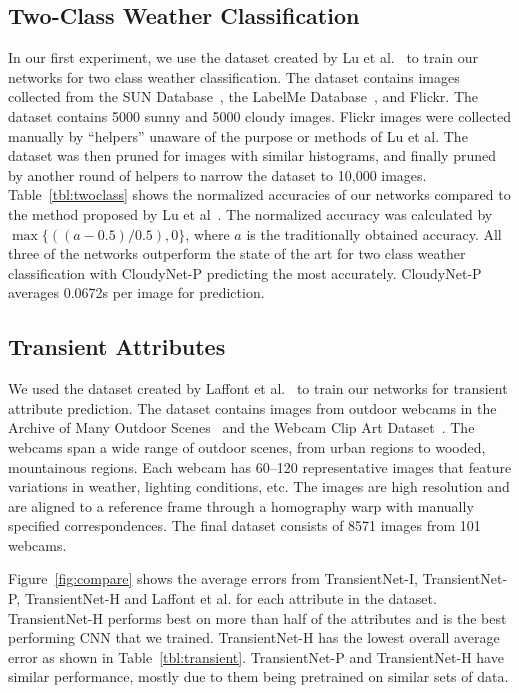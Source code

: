 \documentclass[10pt,twocolumn,letterpaper]{article}
\newcommand{\figref}[1]{Figure~\ref{fig:#1}}
\newcommand{\tblref}[1]{Table~\ref{tbl:#1}}
\begin{document}
\subsection{Two-Class Weather Classification}
\indent
In our first experiment, we use the dataset created by Lu et
al.~\cite{lutwoclass} to train our networks for two class weather
classification.  The dataset contains images collected from the SUN
Database~\cite{xiaoSUN}, the LabelMe Database~\cite{russell2008labelme}, and
Flickr. The dataset contains 5000 sunny and 5000 cloudy images. Flickr images
were collected manually by ``helpers'' unaware of the purpose or methods of Lu
et al. The dataset was then pruned for images with similar histograms, and
finally pruned by another round of helpers to narrow the dataset to 10,000
images.  \tblref{twoclass} shows the normalized accuracies of our networks
compared to the method proposed by Lu et al~\cite{lutwoclass}.  The normalized
accuracy was calculated by $ \max\{((a - 0.5) / 0.5), 0\} $, where $a$ is the
traditionally obtained accuracy. All three of the networks outperform the state
of the art for two class weather classification with CloudyNet-P predicting the
most accurately.  CloudyNet-P averages 0.0672s per image for prediction. 

\subsection{Transient Attributes}
\indent
We used the dataset created by Laffont et al.~\cite{Laffont14} to train our
networks for transient attribute prediction. The dataset contains images from
outdoor webcams in the Archive of Many Outdoor Scenes~\cite{jacobs07amos} and
the Webcam Clip Art Dataset~\cite{lalondesig09}.  The webcams span a wide range
of outdoor scenes, from urban regions to wooded, mountainous regions. Each
webcam has 60--120 representative images that feature variations in weather,
lighting conditions, etc.  The images are high resolution and are aligned to a
reference frame through a homography warp with manually specified
correspondences.  The final dataset consists of 8571 images from 101 webcams.

\figref{compare} shows the average errors from TransientNet-I, TransientNet-P,
TransientNet-H and Laffont et al. for each attribute in the dataset.
TransientNet-H performs best on more than half of the attributes and is the
best performing CNN that we trained.  TransientNet-H has the lowest overall
average error as shown in \tblref{transient}.  TransientNet-P and
TransientNet-H have similar performance, mostly due to them being pretrained on
similar sets of data.
\end{document}
